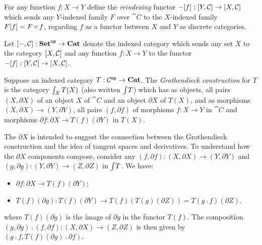\begin{definition}[Reindexing]
For any function $f: X \to Y$ define the \emph{reindexing} functor $-[f]: [Y,\mathcal{C}] \to
[X,\mathcal{C}]$ which sends any $Y$-indexed family $F$ over $\cat{C}$ to the $X$-indexed family
$F[f] = F \circ f$, regarding $f$ as a functor between $X$ and $Y$ as discrete categories.
\end{definition}

\begin{definition}
Let $[-,\mathcal{C}]: \mathbf{Set}^{\mathsf{op}} \to \mathbf{Cat}$ denote the indexed category which sends any set $X$ to the
category $[X,\mathcal{C}]$ and any function $f: X \to Y$ to the functor $-[f]: [Y,\mathcal{C}]
\to [X,\mathcal{C}]$.
\end{definition}

\begin{definition}
\label{def:grothendieck:Grothendieck}
Suppose an indexed category $T: \mathcal{C}^{\mathsf{op}} \to \mathbf{Cat}$. The \emph{Grothendieck construction} for $T$ is the
category $\int_{X}T(X)$ (also written $\int_{}T$) which has as objects, all pairs $(X,
\partial X)$ of an object $X$ of $\cat{C}$ and an object $\partial X$ of $T(X)$, and as morphisms $(X,
\partial X) \to (Y, \partial Y)$, all pairs $(f, \partial f)$ of morphisms $f: X \to Y$ in $\cat{C}$ and
morphisms $\partial f: \partial X \to T(f)(\partial Y)$ in $T(X)$.
\end{definition}

\noindent The $\partial X$ is intended to suggest the connection between the Grothendieck construction and the
idea of tangent spaces and derivatives. To understand how the $\partial X$ components compose, consider any
$(f, \partial f): (X, \partial X) \to (Y, \partial Y)$ and $(g, \partial g): (Y, \partial Y) \to (Z, \partial
Z)$ in $\int_{}T$. We have:

\begin{itemize}
\item $\partial f: \partial X \to T(f)(\partial Y)$;
\item $T(f)(\partial g): T(f)(\partial Y) \to T(f)(T(g)(\partial Z)) = T(g \comp f)(\partial Z)$.
\end{itemize}

\noindent where $T(f)(\partial g)$ is the image of $\partial g$ in the functor $T(f)$. The composition $(g,
\partial g) \comp (f, \partial f): (X, \partial X) \to (Z, \partial Z)$ is then given by $(g \comp f,
T(f)(\partial g) \comp \partial f)$.

